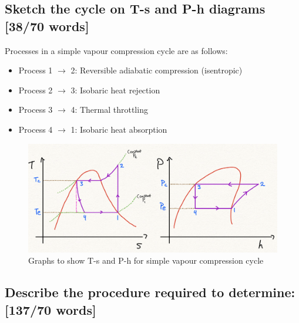 \documentclass[12pt]{article}
\numberwithin{equation}{section}
\begin{document}
\begin{flushleft}
\subsection[T-s P-h Diagrams.]{Sketch the cycle on T-s and P-h diagrams [38/70 words]}
Processes in a simple vapour compression cycle are as follows:
\begin{itemize}
  \item Process 1 $\rightarrow$ 2: Reversible adiabatic compression (isentropic)
  \item Process 2 $\rightarrow$ 3: Isobaric heat rejection
  \item Process 3 $\rightarrow$ 4: Thermal throttling
  \item Process 4 $\rightarrow$ 1: Isobaric heat absorption
\end{itemize}
\begin{figure}[H]
  \centering
  \includegraphics[width  = \textwidth]{./img/TsPhDiagrams64.png}
  \caption{Graphs to show T-s and P-h for simple vapour compression cycle}
\end{figure}
\subsection{Describe the procedure required to determine: [137/70 words]}

\end{flushleft}
\end{document}
